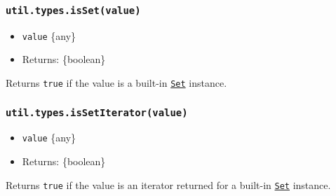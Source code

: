 \subsubsection{\texorpdfstring{\texttt{util.types.isSet(value)}}{util.types.isSet(value)}}\label{util.types.issetvalue}

\begin{itemize}
\tightlist
\item
  \texttt{value} \{any\}
\item
  Returns: \{boolean\}
\end{itemize}

Returns \texttt{true} if the value is a built-in
\href{https://developer.mozilla.org/en-US/docs/Web/JavaScript/Reference/Global_Objects/Set}{\texttt{Set}}
instance.

\begin{Shaded}
\begin{Highlighting}[]
\NormalTok{(} \NormalTok{())}\OperatorTok{;}  
\end{Highlighting}
\end{Shaded}

\subsubsection{\texorpdfstring{\texttt{util.types.isSetIterator(value)}}{util.types.isSetIterator(value)}}\label{util.types.issetiteratorvalue}

\begin{itemize}
\tightlist
\item
  \texttt{value} \{any\}
\item
  Returns: \{boolean\}
\end{itemize}

Returns \texttt{true} if the value is an iterator returned for a
built-in
\href{https://developer.mozilla.org/en-US/docs/Web/JavaScript/Reference/Global_Objects/Set}{\texttt{Set}}
instance.

